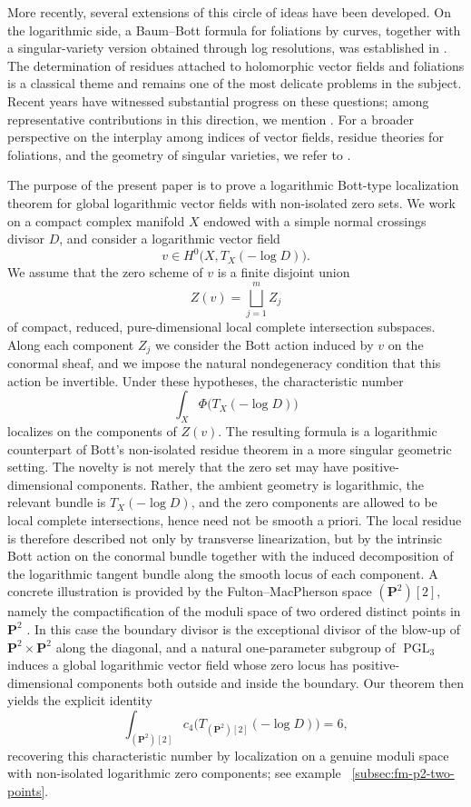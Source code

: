 \documentclass[12pt,a4paper,dvipsnames,x11names]{amsart}
\numberwithin{equation}{section}
\theoremstyle{plain}
\theoremstyle{definition}
\theoremstyle{remark}
\begin{document}
More recently, several extensions of this circle of ideas have been developed. On the logarithmic side, a Baum--Bott formula for foliations by curves, together with a singular-variety version obtained through log resolutions, was established in \cite{CorreaLourencoMachado24}. The determination of residues attached to holomorphic vector fields and foliations is a classical theme and remains one of the most delicate problems in the subject.  Recent years have witnessed substantial progress on these questions; among representative contributions in this direction, we mention \cite{CorreaSuwa25,CorreaLourenco19,KaufmannLarkangWulcan23}. For a broader perspective on the interplay among indices of vector fields, residue theories for foliations, and the geometry of singular varieties, we refer to \cite{SuwaBook,BrasseletSeadeSuwa09,CorreaSeade26}.  

The purpose of the present paper is to prove a logarithmic Bott-type localization theorem for global logarithmic vector fields with non-isolated zero sets. We work on a compact complex manifold $X$ endowed with a simple normal crossings divisor $D$, and consider a logarithmic vector field
$$
v\in H^0\bigl(X,T_X(-\log D)\bigr).
$$
We assume that the zero scheme of $v$ is a finite disjoint union
$$
Z(v)=\bigsqcup_{j=1}^m Z_j
$$
of compact, reduced, pure-dimensional local complete intersection subspaces. Along each component $Z_j$ we consider the Bott action induced by $v$ on the conormal sheaf, and we impose the natural nondegeneracy condition that this action be invertible. Under these hypotheses, the characteristic number
$$
\int_X \Phi\bigl(T_X(-\log D)\bigr)
$$
localizes on the components of $Z(v)$.
The resulting formula is a logarithmic counterpart of Bott's non-isolated residue theorem in a more singular geometric setting. The novelty is not merely that the zero set may have positive-dimensional components. Rather, the ambient geometry is logarithmic, the relevant bundle is $T_X(-\log D)$, and the zero components are allowed to be local complete intersections, hence need not be smooth a priori. The local residue is therefore described not only by transverse linearization, but by the intrinsic Bott action on the conormal bundle together with the induced decomposition of the logarithmic tangent bundle along the smooth locus of each component. 
A concrete illustration is provided by the Fulton--MacPherson space $(\mathbf P^2)[2]$, namely the compactification of the moduli space of two ordered distinct points in $\mathbf P^2$ \cite{FultonMacPherson94}. In this case the boundary divisor is the exceptional divisor of the blow-up of $\mathbf P^2\times \mathbf P^2$ along the diagonal, and a natural one-parameter subgroup of $\operatorname{PGL}_3$ induces a global logarithmic vector field whose zero locus has positive-dimensional components both outside and inside the boundary. Our theorem then yields the explicit identity
$$
\int_{(\mathbf P^2)[2]} c_4\bigl(T_{(\mathbf P^2)[2]}(-\log D)\bigr)=6,
$$
recovering this characteristic number by localization on a genuine moduli space with non-isolated logarithmic zero components; see example ~\ref{subsec:fm-p2-two-points}.
\end{document}
